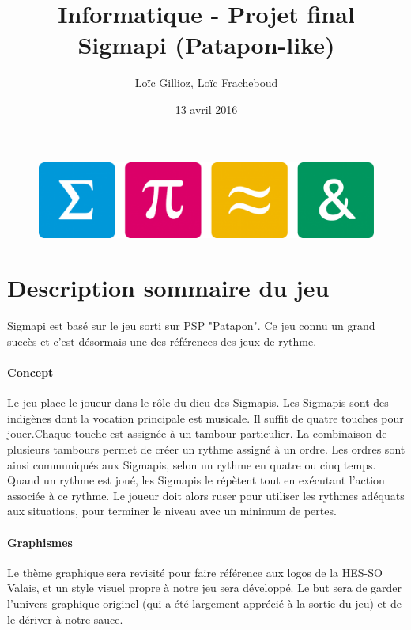 \documentclass[a4paper , 10pt]{article}
\author{Loïc Gillioz, Loïc Fracheboud}
\title{Informatique - Projet final \\ \Huge Sigmapi (Patapon-like)}
\date{13 avril 2016}
\begin{document}
\maketitle
\begin{figure}[!h]
\centering
\includegraphics[scale=0.15]{images/icones}
\end{figure}
\pagebreak

\section{Description sommaire du jeu}
Sigmapi est basé sur le jeu sorti sur PSP "Patapon". Ce jeu connu un grand succès et c'est désormais une des références des jeux de rythme.
\paragraph*{Concept}
Le jeu place le joueur dans le rôle du dieu des Sigmapis. Les Sigmapis sont des indigènes dont la vocation principale est musicale.
Il suffit de quatre touches pour jouer.Chaque touche est assignée à un tambour particulier. La combinaison de plusieurs tambours permet de créer un rythme assigné à un ordre. Les ordres sont ainsi communiqués aux Sigmapis, selon un rythme en quatre ou cinq temps. Quand un rythme est joué, les Sigmapis le répètent tout en exécutant l'action associée à ce rythme. Le joueur doit alors ruser pour utiliser les rythmes adéquats aux situations, pour terminer le niveau avec un minimum de pertes.
\paragraph*{Graphismes}
Le thème graphique sera revisité pour faire référence aux logos de la HES-SO Valais, et un style visuel propre à notre jeu sera développé. Le but sera de garder l'univers graphique originel (qui a été largement apprécié à la sortie du jeu) et de le dériver à notre sauce.
\end{document}
